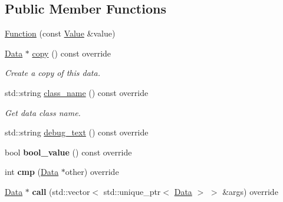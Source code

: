 \subsection*{Public Member Functions}
\begin{DoxyCompactItemize}
\item 
\hyperlink{classcreek_1_1_function_a97ef1872acbb90cfcd021b250cda793b}{Function} (const \hyperlink{classcreek_1_1_function_a544b21896f7382ae5a409fe5886aed6f}{Value} \&value)
\item 
\hyperlink{classcreek_1_1_data}{Data} $\ast$ \hyperlink{classcreek_1_1_function_ac2e605422cebc44b39dc57c4820e9bb0}{copy} () const  override\hypertarget{classcreek_1_1_function_ac2e605422cebc44b39dc57c4820e9bb0}{}\label{classcreek_1_1_function_ac2e605422cebc44b39dc57c4820e9bb0}

\begin{DoxyCompactList}\small\item\em Create a copy of this data. \end{DoxyCompactList}\item 
std\+::string \hyperlink{classcreek_1_1_function_a51e3223a6b3367f715b905181c3d2349}{class\+\_\+name} () const  override\hypertarget{classcreek_1_1_function_a51e3223a6b3367f715b905181c3d2349}{}\label{classcreek_1_1_function_a51e3223a6b3367f715b905181c3d2349}

\begin{DoxyCompactList}\small\item\em Get data class name. \end{DoxyCompactList}\item 
std\+::string \hyperlink{classcreek_1_1_function_ae31495346f72a6bdcd9f469d94bd1f6e}{debug\+\_\+text} () const  override
\item 
bool {\bfseries bool\+\_\+value} () const  override\hypertarget{classcreek_1_1_function_aebc32a311d74b8eab63c78535face480}{}\label{classcreek_1_1_function_aebc32a311d74b8eab63c78535face480}

\item 
int {\bfseries cmp} (\hyperlink{classcreek_1_1_data}{Data} $\ast$other) override\hypertarget{classcreek_1_1_function_accd3eaffc63020157a86217c3db8dbf0}{}\label{classcreek_1_1_function_accd3eaffc63020157a86217c3db8dbf0}

\item 
\hyperlink{classcreek_1_1_data}{Data} $\ast$ {\bfseries call} (std\+::vector$<$ std\+::unique\+\_\+ptr$<$ \hyperlink{classcreek_1_1_data}{Data} $>$ $>$ \&args) override\hypertarget{classcreek_1_1_function_a7b3323022de4b5e46caff1a7747da21d}{}\label{classcreek_1_1_function_a7b3323022de4b5e46caff1a7747da21d}

\end{DoxyCompactItemize}


